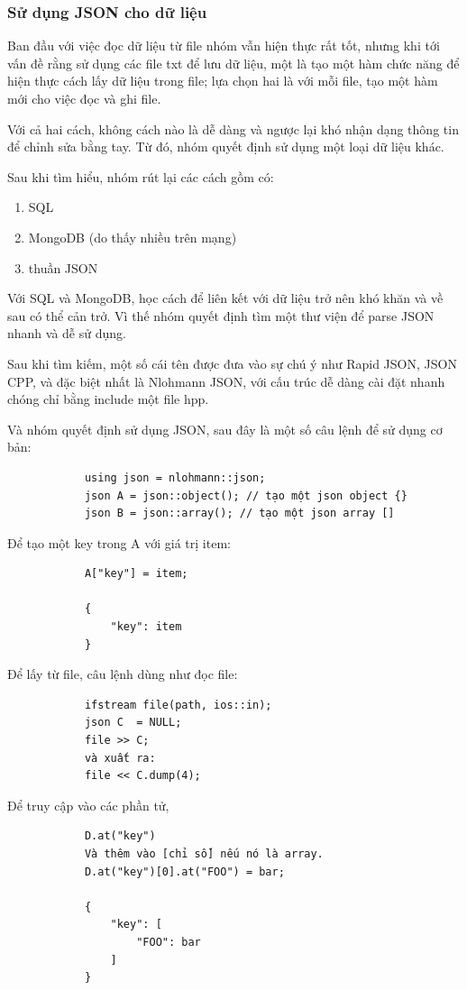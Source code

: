 \documentclass[12pt,a4paper]{report}
\begin{document}
            \subsubsection{Sử dụng JSON cho dữ liệu}
            Ban đầu với việc đọc dữ liệu từ file nhóm vẫn hiện thực rất tốt, nhưng khi tới vấn đề rằng sử dụng các file txt để lưu dữ liệu, một là tạo một hàm chức năng để hiện thực cách lấy dữ liệu trong file; lựa chọn hai là với mỗi file, tạo một hàm mới cho việc đọc và ghi file.\par
            Với cả hai cách, không cách nào là dễ dàng và ngược lại khó nhận dạng thông tin để chỉnh sửa bằng tay. Từ đó, nhóm quyết định sử dụng một loại dữ liệu khác. \par
            Sau khi tìm hiểu, nhóm rút lại các cách gồm có:
            \begin{enumerate}
                \item SQL
                \item MongoDB (do thấy nhiều trên mạng)
                \item thuần JSON
            \end{enumerate}
            Với SQL và MongoDB, học cách để liên kết với dữ liệu trở nên khó khăn và về sau có thể cản trở. Vì thế nhóm quyết định tìm một thư viện để parse JSON nhanh và dễ sử dụng.\par
            Sau khi tìm kiếm, một số cái tên được đưa vào sự chú ý như Rapid JSON, JSON CPP, và đặc biệt nhất là Nlohmann JSON, với cấu trúc dễ dàng cài đặt nhanh chóng chỉ bằng include một file hpp.\par
            Và nhóm quyết định sử dụng JSON, sau đây là một số câu lệnh để sử dụng cơ bản:
            \begin{verbatim}
            using json = nlohmann::json;
            json A = json::object(); // tạo một json object {}
            json B = json::array(); // tạo một json array []
            \end{verbatim}
            Để tạo một key trong A với giá trị item:
            \begin{verbatim}
            A["key"] = item;

            {
                "key": item
            }
            \end{verbatim}
            Để lấy từ file, câu lệnh dùng như đọc file:
            \begin{verbatim}
            ifstream file(path, ios::in);
            json C  = NULL;
            file >> C;
            và xuất ra:
            file << C.dump(4);
            \end{verbatim}
            Để truy cập vào các phần tử,
            \begin{verbatim}
            D.at("key")
            Và thêm vào [chỉ số] nếu nó là array.
            D.at("key")[0].at("FOO") = bar;

            {
                "key": [
                    "FOO": bar
                ]
            }
            \end{verbatim}
\end{document}
